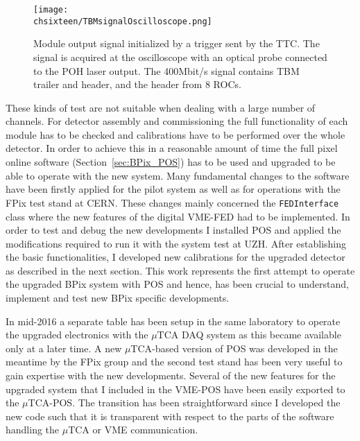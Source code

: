 \begin{figure}[!htb]
 \begin{center}
  \texttt{[image: \\chsixteen/TBMsignalOscilloscope.png]}
 \end{center}
 \caption{Module output signal initialized by a trigger sent by the TTC. The signal is acquired at the oscilloscope with an optical probe connected to the POH laser output. The 400\unit{Mbit/s} signal contains TBM trailer and header, and the header from 8 ROCs.}
 \label{fig:TestTBM}
\end{figure} 

These kinds of test are not suitable when dealing with a large number of channels. For detector assembly and commissioning the full functionality of each module has to be checked and calibrations have to be performed over the whole detector. In order to achieve this in a reasonable amount of time the full pixel online software (Section~\ref{sec:BPix_POS}) has to be used and upgraded to be able to operate with the new system.
Many fundamental changes to the software have been firstly applied for the pilot system as well as for operations with the FPix test stand at CERN.
These changes mainly concerned the \texttt{FEDInterface} class where the new features of the digital VME-FED had to be implemented.
In order to test and debug the new developments I installed POS and applied the modifications required to run it with the system test at UZH.
After establishing the basic functionalities, I developed new calibrations for the upgraded detector as described in the next section.
This work represents the first attempt to operate the upgraded BPix system with POS and hence, has been crucial to understand, implement and test new BPix specific developments.

In mid-2016 a separate table has been setup in the same laboratory to operate the upgraded electronics with the $\mu$TCA DAQ system as this became available only at a later time.
A new $\mu$TCA-based version of POS was developed in the meantime by the FPix group and the second test stand has been very useful to gain expertise with the new developments.
Several of the new features for the upgraded system that I included in the VME-POS have been easily exported to the $\mu$TCA-POS.
The transition has been straightforward since I developed the new code such that it is transparent with respect to the parts of the software handling the $\mu$TCA or VME communication.

